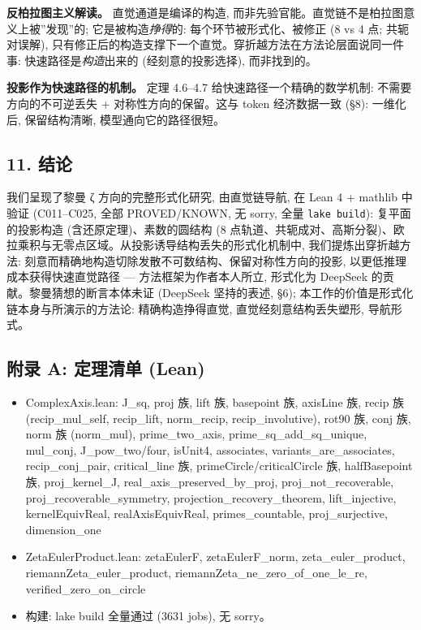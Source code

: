 \documentclass[
]{article}
\providecommand{\tightlist}{%
  \setlength{\itemsep}{0pt}\setlength{\parskip}{0pt}}
\begin{document}
\textbf{反柏拉图主义解读。} 直觉通道是编译的构造,
而非先验官能。直觉链不是柏拉图意义上被''发现''的;
它是被构造\emph{挣得}的: 每个环节被形式化、被修正 (8 vs 4 点;
共轭对误解),
只有修正后的构造支撑下一个直觉。穿折越方法在方法论层面说同一件事:
快速路径是\emph{构造}出来的 (经刻意的投影选择), 而非找到的。

\textbf{投影作为快速路径的机制。} 定理 4.6--4.7
给快速路径一个精确的数学机制: 不需要方向的不可逆丢失 +
对称性方向的保留。这与 token 经济数据一致 (§8): 一维化后, 保留结构清晰,
模型通向它的路径很短。

\subsection{11. 结论}\label{ux7ed3ux8bba}

我们呈现了黎曼 ζ 方向的完整形式化研究, 由直觉链导航, 在 Lean 4 + mathlib
中验证 (C011--C025, 全部 PROVED/KNOWN, 无 sorry, 全量
\texttt{lake\ build}): 复平面的投影构造 (含还原定理)、素数的圆结构 (8
点轨道、共轭成对、高斯分裂)、欧拉乘积与无零点区域。从投影诱导结构丢失的形式化机制中,
我们提炼出穿折越方法:
刻意而精确地构造切除发散不可数结构、保留对称性方向的投影,
以更低推理成本获得快速直觉路径 --- 方法框架为作者本人所立, 形式化为
DeepSeek 的贡献。黎曼猜想的断言本体未证 (DeepSeek 坚持的表述, §6);
本工作的价值是形式化链本身与所演示的方法论: 精确构造挣得直觉,
直觉经刻意结构丢失塑形, 导航形式。

\subsection{附录 A: 定理清单
(Lean)}\label{ux9644ux5f55-a-ux5b9aux7406ux6e05ux5355-lean}

\begin{itemize}
\tightlist
\item
  ComplexAxis.lean: J\_sq, proj 族, lift 族, basepoint 族, axisLine 族,
  recip 族 (recip\_mul\_self, recip\_lift, norm\_recip,
  recip\_involutive), rot90 族, conj 族, norm 族 (norm\_mul),
  prime\_two\_axis, prime\_sq\_add\_sq\_unique, mul\_conj,
  J\_pow\_two/four, isUnit4, associates, variants\_are\_associates,
  recip\_conj\_pair, critical\_line 族, primeCircle/criticalCircle 族,
  halfBasepoint 族, proj\_kernel\_J, real\_axis\_preserved\_by\_proj,
  proj\_not\_recoverable, proj\_recoverable\_symmetry,
  projection\_recovery\_theorem, lift\_injective, kernelEquivReal,
  realAxisEquivReal, primes\_countable, proj\_surjective, dimension\_one
\item
  ZetaEulerProduct.lean: zetaEulerF, zetaEulerF\_norm,
  zeta\_euler\_product, riemannZeta\_euler\_product,
  riemannZeta\_ne\_zero\_of\_one\_le\_re, verified\_zero\_on\_circle
\item
  构建: lake build 全量通过 (3631 jobs), 无 sorry。
\end{itemize}
\end{document}
